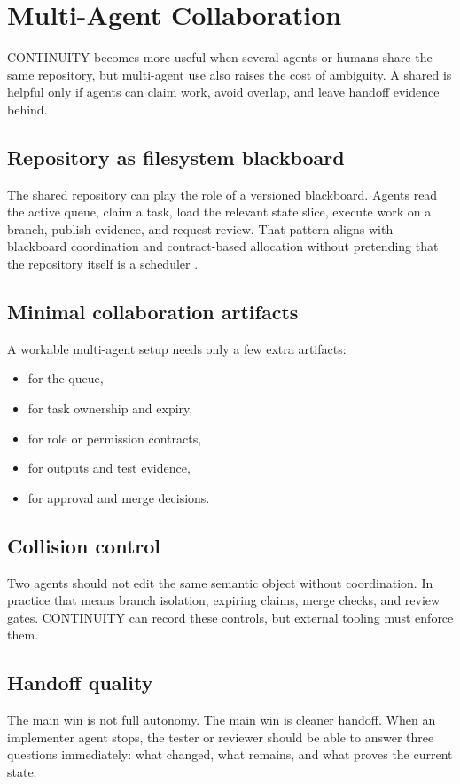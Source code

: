 
\section{Multi-Agent Collaboration}



CONTINUITY becomes more useful when several agents or humans share the same repository, but multi-agent use also raises the cost of ambiguity. A shared  is helpful only if agents can claim work, avoid overlap, and leave handoff evidence behind.

\subsection{Repository as filesystem blackboard}

The shared repository can play the role of a versioned blackboard. Agents read the active queue, claim a task, load the relevant state slice, execute work on a branch, publish evidence, and request review. That pattern aligns with blackboard coordination and contract-based allocation without pretending that the repository itself is a scheduler \cite{Corkill1991Blackboard,Smith1980ContractNet}.

\subsection{Minimal collaboration artifacts}

A workable multi-agent setup needs only a few extra artifacts:
\begin{itemize}
  \item {} for the queue,
  \item {} for task ownership and expiry,
  \item {} for role or permission contracts,
  \item {} for outputs and test evidence,
  \item {} for approval and merge decisions.
\end{itemize}

\subsection{Collision control}

Two agents should not edit the same semantic object without coordination. In practice that means branch isolation, expiring claims, merge checks, and review gates. CONTINUITY can record these controls, but external tooling must enforce them.

\subsection{Handoff quality}

The main win is not full autonomy. The main win is cleaner handoff. When an implementer agent stops, the tester or reviewer should be able to answer three questions immediately: what changed, what remains, and what proves the current state.
